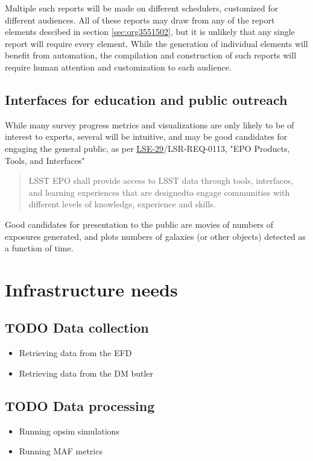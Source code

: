 Multiple such reports will be made on different schedulers, customized for different audiences.
All of these reports may draw from any of the report elements descibed in section \ref{sec:org3551502}, but it is unlikely that any single report will require every element.
While the generation of individual elements will benefit from automation, the compilation and construction of such reports will require human attention and customization to each audience.

\subsection{Interfaces for education and public outreach}
\label{sec:orgb35c728}
While many survey progress metrics and visualizations are only likely to be of interest to experts, several will be intuitive, and may be good candidates for engaging the general public, as per \href{https://ls.st/lse-29}{LSE-29}/LSR-REQ-0113, "EPO Products, Tools, and Interfaces"
\begin{quote}
LSST EPO shall provide access to LSST data through tools, interfaces,
and learning experiences that are designedto engage communities with
different levels of knowledge, experience and skills.
\end{quote}
Good candidates for presentation to the public are movies of numbers of exposures generated, and plots numbers of galaxies (or other objects) detected as a function of time.
\section{Infrastructure needs}
\label{sec:orgae8a0ff}
\subsection{{\bfseries\sffamily TODO} Data collection}
\label{sec:orgc733182}
\begin{itemize}
\item Retrieving data from the EFD
\label{sec:org2475118}
\item Retrieving data from the DM butler
\label{sec:org2db7127}
\end{itemize}
\subsection{{\bfseries\sffamily TODO} Data processing}
\label{sec:orgf15bdb7}
\begin{itemize}
\item Running opsim simulations
\label{sec:org579ab86}
\item Running MAF metrics
\label{sec:org7a4d45d}
\end{itemize}

